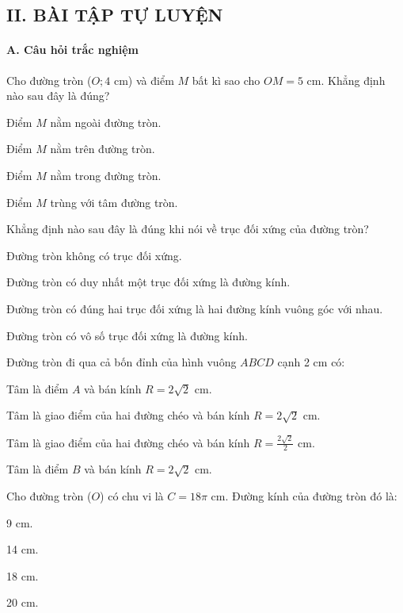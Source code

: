 \documentclass[%
    fontsize=12pt,%
    chapterprefix=false,%
    open=right,%
    twoside=false,%
    numbers=noenddot,%
    headings=optiontohead,%
    final,%
    DIV=15,%
    parskip=half %
]{scrbook}
\begin{document}
\subsection{II. BÀI TẬP TỰ LUYỆN}
\paragraph{A. Câu hỏi trắc nghiệm}

\begin{tracnghiem}

\item Cho đường tròn ($ O; 4 $ cm) và điểm $ M $ bất kì sao cho $ OM = 5 $ cm. Khẳng định nào sau đây là đúng?
\begin{options}
  \item Điểm $ M $ nằm ngoài đường tròn.
  \item Điểm $ M $ nằm trên đường tròn.
  \item Điểm $ M $ nằm trong đường tròn.
  \item Điểm $ M $ trùng với tâm đường tròn.
\end{options}

\item Khẳng định nào sau đây là đúng khi nói về trục đối xứng của đường tròn?
\begin{options}
  \item Đường tròn không có trục đối xứng.
  \item Đường tròn có duy nhất một trục đối xứng là đường kính.
  \item Đường tròn có đúng hai trục đối xứng là hai đường kính vuông góc với nhau.
  \item Đường tròn có vô số trục đối xứng là đường kính.
\end{options}

\item Đường tròn đi qua cả bốn đỉnh của hình vuông $ABCD$ cạnh 2 cm có:
\begin{options}
  \item Tâm là điểm $A$ và bán kính $R = 2\sqrt{2}$ cm.
  \item Tâm là giao điểm của hai đường chéo và bán kính $R = 2\sqrt{2}$ cm.
  \item Tâm là giao điểm của hai đường chéo và bán kính $R = \frac{2\sqrt{2}}{2}$ cm.
  \item Tâm là điểm $B$ và bán kính $R = 2\sqrt{2}$ cm.
\end{options}

\item Cho đường tròn ($O$) có chu vi là $C = 18\pi$ cm. Đường kính của đường tròn đó là:
\begin{options}
  \item 9 cm.
  \item 14 cm.
  \item 18 cm.
  \item 20 cm.
\end{options}


\end{tracnghiem}
\end{document}
